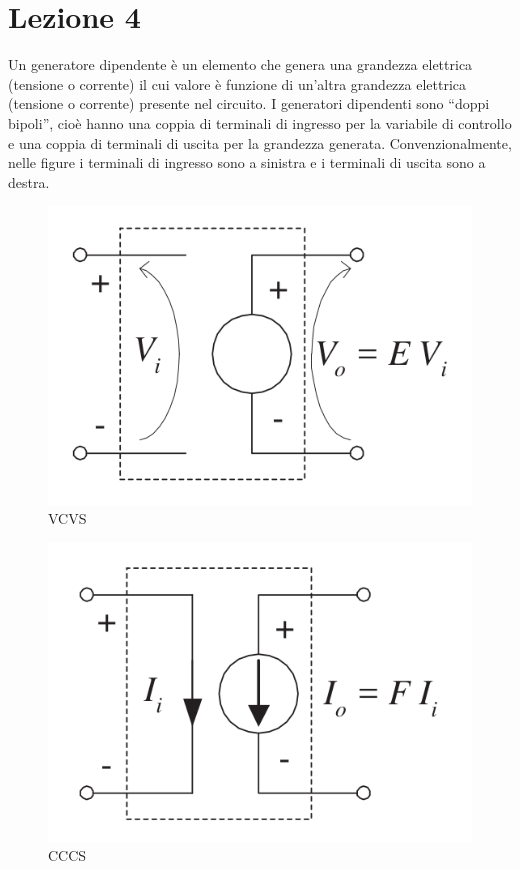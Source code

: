 \section{Lezione 4}

\begin{defn}
    Un generatore dipendente è un elemento che genera una grandezza elettrica (tensione o corrente) il cui valore è funzione di
    un'altra grandezza elettrica (tensione o corrente) presente nel circuito.
    I generatori dipendenti sono “doppi bipoli”, cioè hanno una coppia di terminali di ingresso per la variabile di controllo e 
    una coppia di terminali di uscita per la grandezza generata. 
    Convenzionalmente, nelle figure i terminali di ingresso sono a sinistra e i terminali di uscita sono a destra.
\end{defn}

\begin{defn}
	\begin{figure}[H]
		\centering
		\includegraphics[width=0.5\linewidth]{figures/VCVS.png}
		\caption{VCVS}
		\label{fig:VCVS}
	\end{figure}
    \noindent
\end{defn}

\begin{defn}
	\begin{figure}[H]
		\centering
		\includegraphics[width=0.5\linewidth]{figures/CCCS.png}
		\caption{CCCS}
		\label{fig:CCCS}
	\end{figure}
    \noindent
\end{defn}

